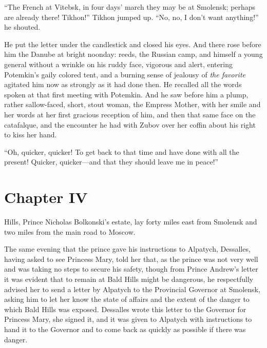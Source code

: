 ``The French at Vitebsk, in four days' march they may be at
Smolensk; perhaps are already there! Tikhon!'' Tikhon jumped
up. ``No, no, I don't want anything!'' he shouted.

He put the letter under the candlestick and closed his eyes. And
there rose before him the Danube at bright noonday: reeds, the
Russian camp, and himself a young general without a wrinkle on
his ruddy face, vigorous and alert, entering Potemkin's gaily
colored tent, and a burning sense of jealousy of \emph{the
favorite} agitated him now as strongly as it had done then. He
recalled all the words spoken at that first meeting with
Potemkin. And he saw before him a plump, rather sallow-faced,
short, stout woman, the Empress Mother, with her smile and her
words at her first gracious reception of him, and then that same
face on the catafalque, and the encounter he had with Zubov over
her coffin about his right to kiss her hand.

``Oh, quicker, quicker! To get back to that time and have done
with all the present! Quicker, quicker---and that they should
leave me in peace!''


\chapter*{Chapter IV} \ifaudio {}
\fi

 Hills, Prince Nicholas Bolkonski's estate, lay forty miles
east from Smolensk and two miles from the main road to Moscow.

The same evening that the prince gave his instructions to
Alpatych, Dessalles, having asked to see Princess Mary, told her
that, as the prince was not very well and was taking no steps to
secure his safety, though from Prince Andrew's letter it was
evident that to remain at Bald Hills might be dangerous, he
respectfully advised her to send a letter by Alpatych to the
Provincial Governor at Smolensk, asking him to let her know the
state of affairs and the extent of the danger to which Bald Hills
was exposed. Dessalles wrote this letter to the Governor for
Princess Mary, she signed it, and it was given to Alpatych with
instructions to hand it to the Governor and to come back as
quickly as possible if there was danger.

